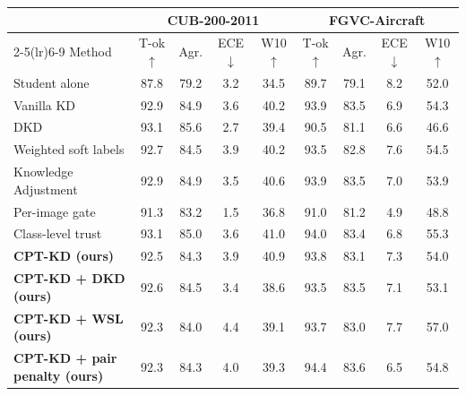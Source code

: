 \begin{tabular}{l cccc cccc}
\toprule
 & \multicolumn{4}{c}{CUB-200-2011} & \multicolumn{4}{c}{FGVC-Aircraft} \\
\cmidrule(lr){2-5}\cmidrule(lr){6-9}
Method & T-ok$\uparrow$ & Agr. & ECE$\downarrow$ & W10$\uparrow$ & T-ok$\uparrow$ & Agr. & ECE$\downarrow$ & W10$\uparrow$ \\
\midrule
Student alone & 87.8 & 79.2 & 3.2 & 34.5 & 89.7 & 79.1 & 8.2 & 52.0 \\
Vanilla KD & 92.9 & 84.9 & 3.6 & 40.2 & 93.9 & 83.5 & 6.9 & 54.3 \\
DKD & 93.1 & 85.6 & 2.7 & 39.4 & 90.5 & 81.1 & 6.6 & 46.6 \\
Weighted soft labels & 92.7 & 84.5 & 3.9 & 40.2 & 93.5 & 82.8 & 7.6 & 54.5 \\
Knowledge Adjustment & 92.9 & 84.9 & 3.5 & 40.6 & 93.9 & 83.5 & 7.0 & 53.9 \\
Per-image gate & 91.3 & 83.2 & 1.5 & 36.8 & 91.0 & 81.2 & 4.9 & 48.8 \\
Class-level trust & 93.1 & 85.0 & 3.6 & 41.0 & 94.0 & 83.4 & 6.8 & 55.3 \\
\textbf{CPT-KD (ours)} & 92.5 & 84.3 & 3.9 & 40.9 & 93.8 & 83.1 & 7.3 & 54.0 \\
\textbf{CPT-KD + DKD (ours)} & 92.6 & 84.5 & 3.4 & 38.6 & 93.5 & 83.5 & 7.1 & 53.1 \\
\textbf{CPT-KD + WSL (ours)} & 92.3 & 84.0 & 4.4 & 39.1 & 93.7 & 83.0 & 7.7 & 57.0 \\
\textbf{CPT-KD + pair penalty (ours)} & 92.3 & 84.3 & 4.0 & 39.3 & 94.4 & 83.6 & 6.5 & 54.8 \\
\bottomrule
\end{tabular}
